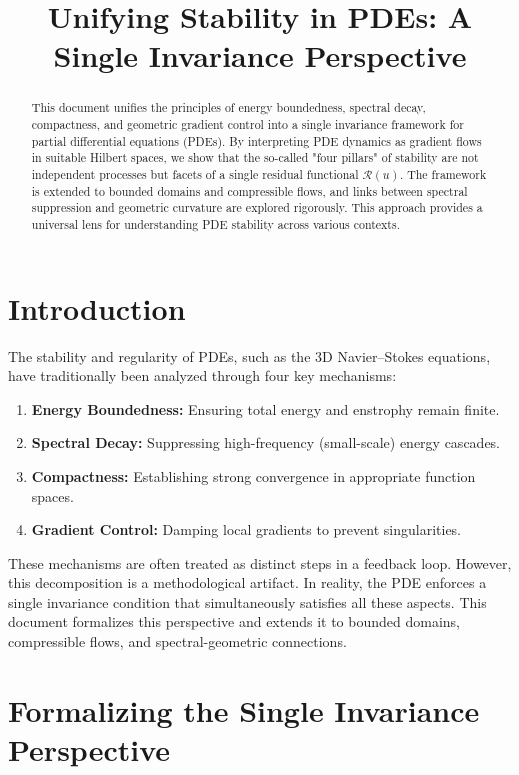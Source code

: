 \documentclass[12pt]{article}
\title{Unifying Stability in PDEs: A Single Invariance Perspective}
\author{}
\date{}
\begin{document}
\maketitle

\begin{abstract}
This document unifies the principles of energy boundedness, spectral decay, compactness, and geometric gradient control into a single invariance framework for partial differential equations (PDEs). By interpreting PDE dynamics as gradient flows in suitable Hilbert spaces, we show that the so-called "four pillars" of stability are not independent processes but facets of a single residual functional \(\mathcal{R}(u)\). The framework is extended to bounded domains and compressible flows, and links between spectral suppression and geometric curvature are explored rigorously. This approach provides a universal lens for understanding PDE stability across various contexts.
\end{abstract}

\section{Introduction}

The stability and regularity of PDEs, such as the 3D Navier--Stokes equations, have traditionally been analyzed through four key mechanisms:
\begin{enumerate}
    \item \textbf{Energy Boundedness:} Ensuring total energy and enstrophy remain finite.
    \item \textbf{Spectral Decay:} Suppressing high-frequency (small-scale) energy cascades.
    \item \textbf{Compactness:} Establishing strong convergence in appropriate function spaces.
    \item \textbf{Gradient Control:} Damping local gradients to prevent singularities.
\end{enumerate}
These mechanisms are often treated as distinct steps in a feedback loop. However, this decomposition is a methodological artifact. In reality, the PDE enforces a single invariance condition that simultaneously satisfies all these aspects. This document formalizes this perspective and extends it to bounded domains, compressible flows, and spectral-geometric connections.

\section{Formalizing the Single Invariance Perspective}
\end{document}
